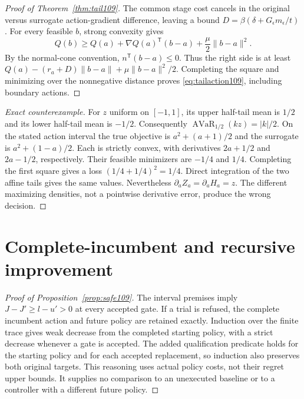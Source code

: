 \begin{proof}[Proof of Theorem~\ref{thm:tail109}]
The common stage cost cancels in the original versus surrogate action-gradient difference, leaving a bound $D=\beta(\delta+G_\epsilon m_\epsilon/t)$. For every feasible $b$, strong convexity gives
\[
 Q(b)\ge Q(a)+\nabla Q(a)^{\mathsf T}(b-a)+\frac\mu2\|b-a\|^2.
\]
By the normal-cone convention, $n^{\mathsf T}(b-a)\le0$. Thus the right side is at least
$Q(a)-(r_a+D)\|b-a\|+\mu\|b-a\|^2/2$.
Completing the square and minimizing over the nonnegative distance proves \eqref{eq:tailaction109}, including boundary actions.
\end{proof}

\begin{proof}[Exact counterexample]
For $z$ uniform on $[-1,1]$, its upper half-tail mean is $1/2$ and its lower half-tail mean is $-1/2$. Consequently $\operatorname{AVaR}_{1/2}(kz)=|k|/2$. On the stated action interval the true objective is $a^2+(a+1)/2$ and the surrogate is $a^2+(1-a)/2$. Each is strictly convex, with derivatives $2a+1/2$ and $2a-1/2$, respectively. Their feasible minimizers are $-1/4$ and $1/4$. Completing the first square gives a loss $(1/4+1/4)^2=1/4$. Direct integration of the two affine tails gives the same values. Nevertheless $\partial_aZ_a=\partial_aH_a=z$. The different maximizing densities, not a pointwise derivative error, produce the wrong decision.
\end{proof}

\section{Complete-incumbent and recursive improvement}\label{supp:improve109}
\begin{proof}[Proof of Proposition~\ref{prop:safe109}]
The interval premises imply $J-J'\ge l-u'>0$ at every accepted gate. If a trial is refused, the complete incumbent action and future policy are retained exactly. Induction over the finite trace gives weak decrease from the completed starting policy, with a strict decrease whenever a gate is accepted. The added qualification predicate holds for the starting policy and for each accepted replacement, so induction also preserves both original targets. This reasoning uses actual policy costs, not their regret upper bounds. It supplies no comparison to an unexecuted baseline or to a controller with a different future policy.
\end{proof}

